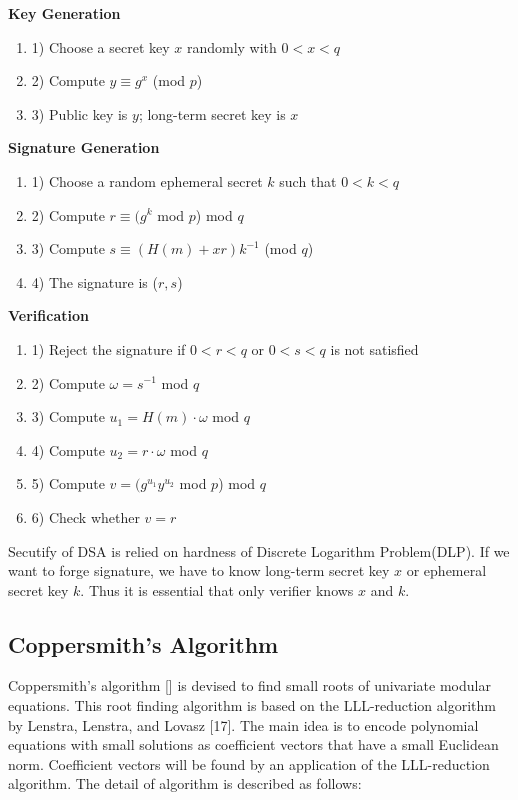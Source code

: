\documentclass[a4paper]{article}
\begin{document}
\textbf{Key Generation}
\begin{enumerate}[label=]
      \item 1) Choose a secret key $x$ randomly with $0<x<q$
      
      \item 2) Compute $y \equiv g^x$ (mod $p$)
      
      \item 3) Public key is $y$; long-term secret key is $x$
\end{enumerate}

\textbf{Signature Generation}
\begin{enumerate}[label=]
      \item 1) Choose a random ephemeral secret $k$ such that $0<k<q$
      
      \item 2) Compute $r \equiv (g^k$ mod $p$) mod $q$
      
      \item 3) Compute $s \equiv (H(m)+xr)k^{-1}$ (mod $q$)
      
      \item 4) The signature is ($r,s$)
\end{enumerate} 

\textbf{Verification}
\begin{enumerate}[label=]
      \item 1) Reject the signature if $0<r<q$ or $0<s<q$ is not satisfied
      \item 2) Compute $\omega = s^{-1}$ mod $q$
      \item 3) Compute $u_1 = H(m) \cdot \omega$ mod $q$
      \item 4) Compute $u_2 = r \cdot \omega$ mod $q$
      \item 5) Compute $v=(g^{u_1} y^{u_2}$ mod $p$) mod $q$
      \item 6) Check whether $v = r$
\end{enumerate} 

Secutify of DSA is relied on hardness of Discrete Logarithm Problem(DLP). If we want to forge signature, we have to know long-term secret key $x$ or ephemeral secret key $k$. Thus it is essential that only verifier knows $x$ and $k$.

\subsection{Coppersmith's Algorithm}
Coppersmith's algorithm [] is devised to find small roots of univariate modular equations. This root finding algorithm is based on the LLL-reduction algorithm by Lenstra, Lenstra, and Lovasz [17]. The main idea is to encode polynomial equations with small solutions as coefficient vectors that have a small Euclidean norm. Coefficient vectors will be found by an application of the LLL-reduction algorithm.
The detail of algorithm is described as follows:
\end{document}
